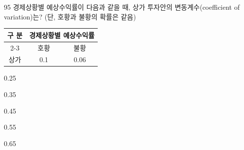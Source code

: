 \begin{question}{95}
경제상황별 예상수익률이 다음과 같을 때, 상가 투자안의 변동계수(coefficient of variation)는? (단, 호황과 불황의 확률은 같음)
\par
{\small\centering
\begin{tabular}{|c|c|c|}\hline
\multirow{2}{*}{구 분} & \multicolumn{2}{c|}{경제상황별 예상수익률}\\\cline{2-3}
 & 호황 & 불황\\\hline
상가 & 0.1 & 0.06\\\hline
\end{tabular}\par}
\begin{choices}
  \item 0.25
  \item 0.35
  \item 0.45
  \item 0.55
  \item 0.65
\end{choices}
\end{question}
